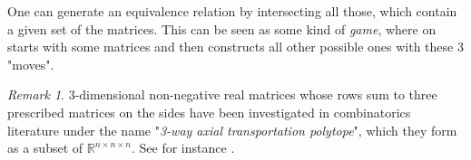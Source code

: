 \documentclass[a4paper]{amsproc}
\theoremstyle{plain}
\theoremstyle{definition}
\theoremstyle{remark}
\newtheorem{remark}[theorem]{Remark}
\numberwithin{equation}{section}
\begin{document}
\begin{center}
\end{center}
\indent One can generate an equivalence relation by intersecting all those, which contain a given set of the matrices. This can be seen as some kind of \emph{game}, where on starts with some matrices and then constructs all other possible ones with these $3$ "moves".


\begin{remark} 
$3$-dimensional non-negative real matrices whose rows sum to three prescribed matrices on the sides have been investigated in combinatorics literature under the name "\emph{3-way axial transportation polytope}", which they form as a subset of $\mathbb{R}^{n\times n\times n}$. See for instance \cite{3way}.\end{remark}%
\end{document}
